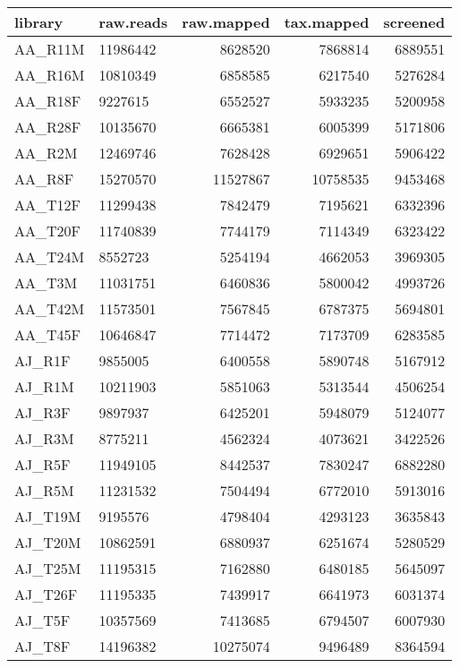 \documentclass[10pt]{bmc_article}
\newenvironment{bmcformat}{\begin{raggedright}\baselineskip20pt\sloppy\setboolean{publ}{false}}{\end{raggedright}\baselineskip20pt\sloppy}
\begin{document}
\begin{bmcformat}
\begin{table}[ht]
\begin{center}
\begin{tabular}{llrrr}
  \hline
library & raw.reads & raw.mapped & tax.mapped & screened \\ 
  \hline
AA\_R11M & 11986442 & 8628520 & 7868814 & 6889551 \\ 
  AA\_R16M & 10810349 & 6858585 & 6217540 & 5276284 \\ 
  AA\_R18F & 9227615 & 6552527 & 5933235 & 5200958 \\ 
  AA\_R28F & 10135670 & 6665381 & 6005399 & 5171806 \\ 
  AA\_R2M & 12469746 & 7628428 & 6929651 & 5906422 \\ 
  AA\_R8F & 15270570 & 11527867 & 10758535 & 9453468 \\ 
  AA\_T12F & 11299438 & 7842479 & 7195621 & 6332396 \\ 
  AA\_T20F & 11740839 & 7744179 & 7114349 & 6323422 \\ 
  AA\_T24M & 8552723 & 5254194 & 4662053 & 3969305 \\ 
  AA\_T3M & 11031751 & 6460836 & 5800042 & 4993726 \\ 
  AA\_T42M & 11573501 & 7567845 & 6787375 & 5694801 \\ 
  AA\_T45F & 10646847 & 7714472 & 7173709 & 6283585 \\ 
  AJ\_R1F & 9855005 & 6400558 & 5890748 & 5167912 \\ 
  AJ\_R1M & 10211903 & 5851063 & 5313544 & 4506254 \\ 
  AJ\_R3F & 9897937 & 6425201 & 5948079 & 5124077 \\ 
  AJ\_R3M & 8775211 & 4562324 & 4073621 & 3422526 \\ 
  AJ\_R5F & 11949105 & 8442537 & 7830247 & 6882280 \\ 
  AJ\_R5M & 11231532 & 7504494 & 6772010 & 5913016 \\ 
  AJ\_T19M & 9195576 & 4798404 & 4293123 & 3635843 \\ 
  AJ\_T20M & 10862591 & 6880937 & 6251674 & 5280529 \\ 
  AJ\_T25M & 11195315 & 7162880 & 6480185 & 5645097 \\ 
  AJ\_T26F & 11195335 & 7439917 & 6641973 & 6031374 \\ 
  AJ\_T5F & 10357569 & 7413685 & 6794507 & 6007930 \\ 
  AJ\_T8F & 14196382 & 10275074 & 9496489 & 8364594 \\ 
   \hline
\end{tabular}
\end{center}
\end{table}



\end{bmcformat}
\end{document}

